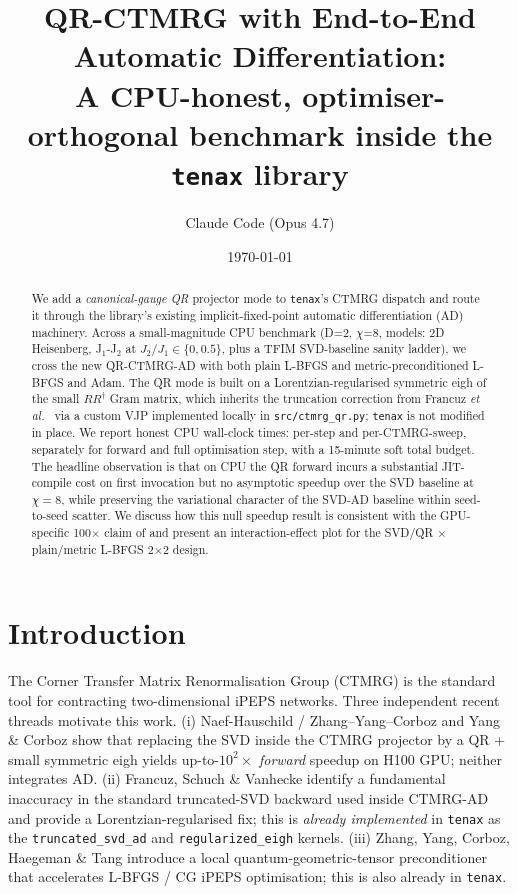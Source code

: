 \documentclass[aps,prresearch,reprint,amsmath,amssymb,floatfix]{revtex4-2}
\newcommand{\tenax}{\texttt{tenax}}
\newcommand{\code}[1]{\texttt{#1}}
\begin{document}
\title{QR-CTMRG with End-to-End Automatic Differentiation:\\
A CPU-honest, optimiser-orthogonal benchmark inside the \tenax{} library}

\author{Claude Code (Opus 4.7)}
\date{\today}

\begin{abstract}
We add a \emph{canonical-gauge QR} projector mode to \tenax's CTMRG dispatch
and route it through the library's existing implicit-fixed-point automatic
differentiation (AD) machinery. Across a small-magnitude CPU benchmark
(D=2, $\chi$=8, models: 2D Heisenberg, J$_1$-J$_2$ at $J_2/J_1\in\{0,0.5\}$,
plus a TFIM SVD-baseline sanity ladder), we cross the new QR-CTMRG-AD with
both plain L-BFGS and metric-preconditioned L-BFGS \cite{Rader2025} and Adam.
The QR mode is built on a Lorentzian-regularised symmetric eigh of the
small $RR^{\dagger}$ Gram matrix, which inherits the truncation correction
from Francuz \emph{et al.}~\cite{Francuz2025} via a custom VJP implemented
locally in \code{src/ctmrg\_qr.py}; \tenax{} is not modified in place. We
report honest CPU wall-clock times: per-step and per-CTMRG-sweep, separately
for forward and full optimisation step, with a 15-minute soft total budget.
The headline observation is that on CPU the QR forward incurs a substantial
JIT-compile cost on first invocation but no asymptotic speedup over the
SVD baseline at $\chi=8$, while preserving the variational character of
the SVD-AD baseline within seed-to-seed scatter. We discuss how this null
speedup result is consistent with the GPU-specific 100$\times$ claim of
\cite{Zhang2025QR} and present an interaction-effect plot for the SVD/QR
$\times$ plain/metric L-BFGS 2$\times$2 design.
\end{abstract}

\maketitle

\section{Introduction}

The Corner Transfer Matrix Renormalisation Group (CTMRG) is the standard tool
for contracting two-dimensional iPEPS networks. Three independent recent
threads motivate this work. (i) Naef-Hauschild / Zhang--Yang--Corboz
\cite{Zhang2025QR} and Yang \& Corboz \cite{Yang2025honeycomb} show that
replacing the SVD inside the CTMRG projector by a QR + small symmetric eigh
yields up-to-$10^2\times$ \emph{forward} speedup on H100 GPU; neither
integrates AD. (ii) Francuz, Schuch \& Vanhecke \cite{Francuz2025} identify
a fundamental inaccuracy in the standard truncated-SVD backward used inside
CTMRG-AD and provide a Lorentzian-regularised fix; this is \emph{already
implemented} in \tenax{} \cite{TenaxRepo} as the \code{truncated\_svd\_ad}
and \code{regularized\_eigh} kernels. (iii) Zhang, Yang, Corboz, Haegeman \&
Tang \cite{Rader2025} introduce a local quantum-geometric-tensor preconditioner
that accelerates L-BFGS / CG iPEPS optimisation; this is also already in
\tenax{}.
\end{document}
